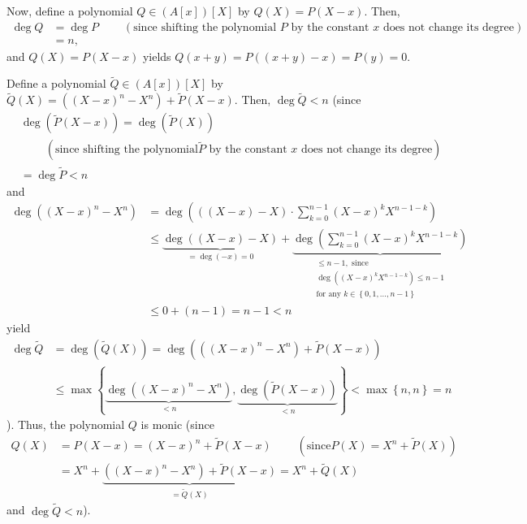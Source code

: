 \documentclass[12pt,final,notitlepage,onecolumn]{article}%
\begin{document}
Now, define a polynomial $Q\in\left(  A\left[  x\right]  \right)  \left[
X\right]  $ by $Q\left(  X\right)  =P\left(  X-x\right)  $. Then,%
\begin{align*}
\deg Q  &  =\deg P\ \ \ \ \ \ \ \ \ \ \left(  \text{since shifting the
polynomial }P\text{ by the constant }x\text{ does not change its
degree}\right) \\
&  =n,
\end{align*}
and $Q\left(  X\right)  =P\left(  X-x\right)  $ yields $Q\left(  x+y\right)
=P\left(  \left(  x+y\right)  -x\right)  =P\left(  y\right)  =0$.

Define a polynomial $\widetilde{Q}\in\left(  A\left[  x\right]  \right)
\left[  X\right]  $ by $\widetilde{Q}\left(  X\right)  =\left(  \left(
X-x\right)  ^{n}-X^{n}\right)  +\widetilde{P}\left(  X-x\right)  $. Then,
$\deg\widetilde{Q}<n$ (since%
\begin{align*}
&  \deg\left(  \widetilde{P}\left(  X-x\right)  \right)  =\deg\left(
\widetilde{P}\left(  X\right)  \right) \\
&  \ \ \ \ \ \ \ \ \ \ \left(  \text{since shifting the polynomial
}\widetilde{P}\text{ by the constant }x\text{ does not change its
degree}\right) \\
&  =\deg\widetilde{P}<n
\end{align*}
and%
\begin{align*}
\deg\left(  \left(  X-x\right)  ^{n}-X^{n}\right)   &  =\deg\left(  \left(
\left(  X-x\right)  -X\right)  \cdot\sum\limits_{k=0}^{n-1}\left(  X-x\right)
^{k}X^{n-1-k}\right) \\
&  \leq\underbrace{\deg\left(  \left(  X-x\right)  -X\right)  }_{=\deg\left(
-x\right)  =0}+\underbrace{\deg\left(  \sum\limits_{k=0}^{n-1}\left(
X-x\right)  ^{k}X^{n-1-k}\right)  }_{\substack{\leq n-1,\text{ since}%
\\\deg\left(  \left(  X-x\right)  ^{k}X^{n-1-k}\right)  \leq n-1\\\text{for
any }k\in\left\{  0,1,...,n-1\right\}  }}\\
&  \leq0+\left(  n-1\right)  =n-1<n
\end{align*}
yield%
\begin{align*}
\deg\widetilde{Q}  &  =\deg\left(  \widetilde{Q}\left(  X\right)  \right)
=\deg\left(  \left(  \left(  X-x\right)  ^{n}-X^{n}\right)  +\widetilde{P}%
\left(  X-x\right)  \right) \\
&  \leq\max\left\{  \underbrace{\deg\left(  \left(  X-x\right)  ^{n}%
-X^{n}\right)  }_{<n},\underbrace{\deg\left(  \widetilde{P}\left(  X-x\right)
\right)  }_{<n}\right\}  <\max\left\{  n,n\right\}  =n
\end{align*}
). Thus, the polynomial $Q$ is monic (since%
\begin{align*}
Q\left(  X\right)   &  =P\left(  X-x\right)  =\left(  X-x\right)
^{n}+\widetilde{P}\left(  X-x\right)  \ \ \ \ \ \ \ \ \ \ \left(  \text{since
}P\left(  X\right)  =X^{n}+\widetilde{P}\left(  X\right)  \right) \\
&  =X^{n}+\underbrace{\left(  \left(  X-x\right)  ^{n}-X^{n}\right)
+\widetilde{P}\left(  X-x\right)  }_{=\widetilde{Q}\left(  X\right)  }%
=X^{n}+\widetilde{Q}\left(  X\right)
\end{align*}
and $\deg\widetilde{Q}<n$).
\end{document}
